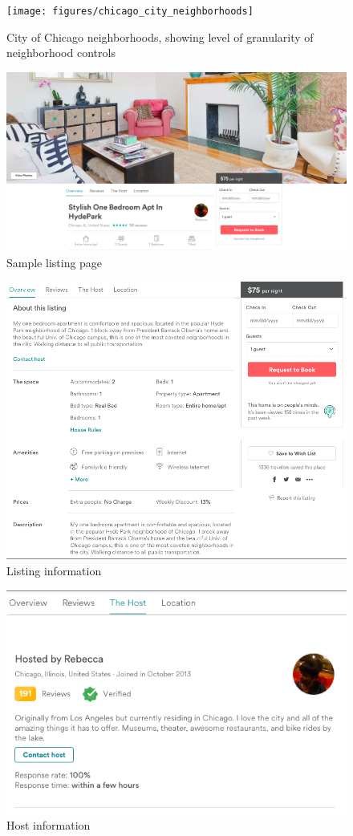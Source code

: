 \begin{figure}\centering
	\texttt{[image: figures/chicago\_city\_neighborhoods]}
	\caption[City of Chicago neighborhoods]{City of Chicago neighborhoods, showing level of granularity of neighborhood controls}
	\label{fig:chicago}
\end{figure}

\begin{figure}[!ht]\centering
	\includegraphics[width=.8\textwidth]{figures/cover}
	\caption{Sample listing page}
	\label{fig:listing}
\end{figure}

\begin{figure}[!ht]\centering
	\includegraphics[width=.8\textwidth]{figures/property}
	\caption{Listing information}
	\label{fig:property}
\end{figure}

\begin{figure}\centering
	\includegraphics[width=.9\textwidth]{figures/host}
	\caption{Host information}
	\label{fig:host}
\end{figure}

